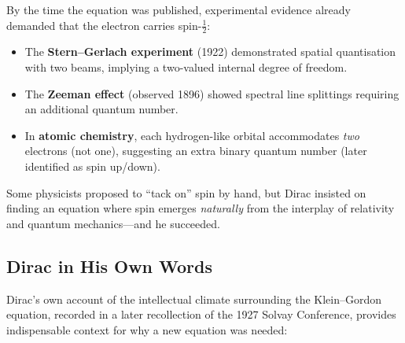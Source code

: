 \documentclass[12pt, a4paper]{article}
\theoremstyle{definition}
\begin{document}
By the time the equation was published, experimental evidence already
demanded that the electron carries spin-$\tfrac{1}{2}$:
\begin{itemize}
    \item The \textbf{Stern--Gerlach experiment} (1922) demonstrated spatial
          quantisation with two beams, implying a two-valued internal degree
          of freedom.
    \item The \textbf{Zeeman effect} (observed 1896) showed spectral line
          splittings requiring an additional quantum number.
    \item In \textbf{atomic chemistry}, each hydrogen-like orbital
          accommodates \emph{two} electrons (not one), suggesting an extra
          binary quantum number (later identified as spin up/down).
\end{itemize}

Some physicists proposed to ``tack on'' spin by hand, but Dirac insisted on
finding an equation where spin emerges \emph{naturally} from the interplay
of relativity and quantum mechanics---and he succeeded.

\subsection{Dirac in His Own Words}

Dirac's own account of the intellectual climate surrounding the Klein--Gordon
equation, recorded in a later recollection of the 1927 Solvay Conference,
provides indispensable context for why a new equation was needed:
\end{document}

